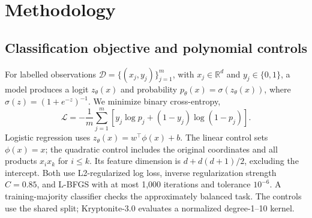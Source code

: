 \documentclass{article}
\begin{document}
\section{Methodology}
\subsection{Classification objective and polynomial controls}
For labelled observations $\mathcal D=\{(x_j,y_j)\}_{j=1}^m$, with $x_j\in\mathbb R^d$ and $y_j\in\{0,1\}$, a model produces a logit $z_\theta(x)$ and probability $p_\theta(x)=\sigma(z_\theta(x))$, where $\sigma(z)=(1+e^{-z})^{-1}$. We minimize binary cross-entropy,
\begin{equation}
\mathcal L=-\frac1m\sum_{j=1}^m\left[y_j\log p_j+(1-y_j)\log(1-p_j)\right].
\label{eq:bce}
\end{equation}
Logistic regression uses $z_\theta(x)=w^\top\phi(x)+b$. The linear control sets $\phi(x)=x$; the quadratic control includes the original coordinates and all products $x_i x_k$ for $i\leq k$. Its feature dimension is $d+d(d+1)/2$, excluding the intercept. Both use L2-regularized log loss, inverse regularization strength $C=0.85$, and L-BFGS with at most 1,000 iterations and tolerance $10^{-6}$. A training-majority classifier checks the approximately balanced task. The controls use the shared split; Kryptonite-3.0 evaluates a normalized degree-1--10 kernel.
\end{document}
